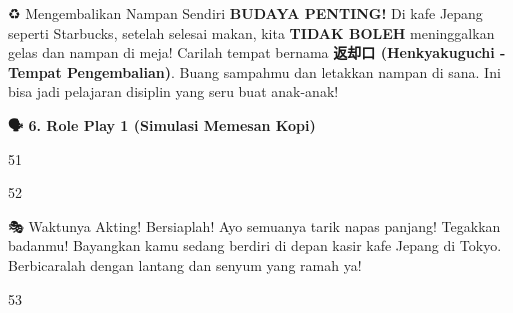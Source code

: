 \begin{lessonbox}{♻️ Mengembalikan Nampan Sendiri}
    \textbf{BUDAYA PENTING!} Di kafe Jepang seperti Starbucks, setelah selesai makan, kita \textbf{TIDAK BOLEH} meninggalkan gelas dan nampan di meja! Carilah tempat bernama \textbf{返却口 (Henkyakuguchi - Tempat Pengembalian)}. Buang sampahmu dan letakkan nampan di sana. Ini bisa jadi pelajaran disiplin yang seru buat anak-anak!
\end{lessonbox}

\vspace{1em}
\begin{tcolorbox}[colback=boxframe, colframe=boxframe, rounded corners, boxrule=0pt, arc=3mm, left=2mm, top=2mm, bottom=2mm]
    \Large \bfseries \color{white} 🗣️ 6. Role Play 1 (Simulasi Memesan Kopi)
\end{tcolorbox}
\vspace{1em}

\begin{convobox}{51}
    \noindent
      
     

    \vspace{1.5em}
\end{convobox}

\begin{convobox}{52}
    \noindent
      
      
      

    \vspace{1.5em}
\end{convobox}

\begin{lessonbox}{🎭 Waktunya Akting! Bersiaplah!}
    Ayo semuanya tarik napas panjang! Tegakkan badanmu! Bayangkan kamu sedang berdiri di depan kasir kafe Jepang di Tokyo. Berbicaralah dengan lantang dan senyum yang ramah ya!
\end{lessonbox}

\begin{convobox}{53}
    \noindent
      

    \vspace{1.5em}
\end{convobox}

